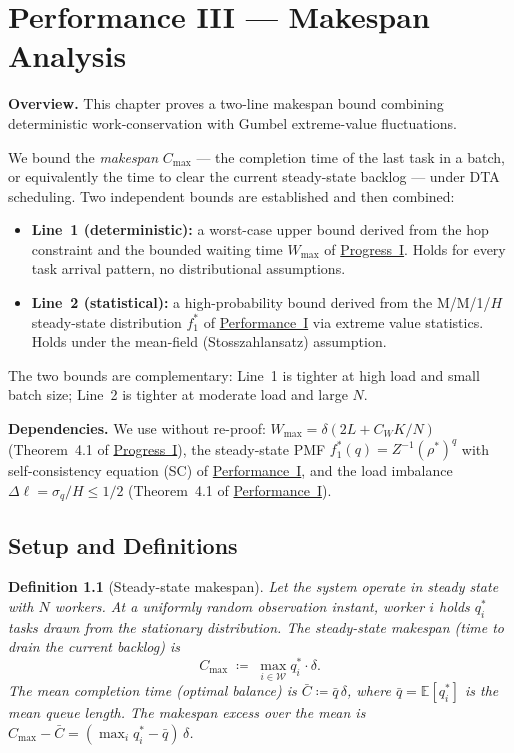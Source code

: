 \documentclass[11pt,a4paper]{report}
\newtheorem{definition}{Definition}[section]
\newcommand{\rhostar}{\rho^{*}}
\newcommand{\Wmax}{W_{\max}}
\newcommand{\qbar}{\bar{q}}
\newcommand{\Dl}{\Delta\ell}
\newcommand{\Cmax}{C_{\max}}
\newcommand{\Cbar}{\bar{C}}
\newcommand{\sigmaq}{\sigma_q}
\begin{document}
\chapter{Performance III --- Makespan Analysis}
\label{chap:makespan}

\bigskip
\noindent\textbf{Overview.}
This chapter proves a two-line makespan bound combining deterministic
work-conservation with Gumbel extreme-value fluctuations.

We bound the \emph{makespan} $\Cmax$ --- the completion time of the last task
in a batch, or equivalently the time to clear the current steady-state
backlog --- under DTA scheduling.
Two independent bounds are established and then combined:
\begin{itemize}
  \item \textbf{Line~1 (deterministic):} a worst-case upper bound derived
        from the hop constraint and the bounded waiting time
        $\Wmax$ of \hyperref[chap:bounded_wait]{Progress~I}.
        Holds for every task arrival pattern, no distributional assumptions.
  \item \textbf{Line~2 (statistical):} a high-probability bound derived
        from the M/M/1/$H$ steady-state distribution $f_1^*$ of
        \hyperref[chap:load_balance]{Performance~I} via extreme value statistics.
        Holds under the mean-field (Stosszahlansatz) assumption.
\end{itemize}
The two bounds are complementary: Line~1 is tighter at high load and
small batch size; Line~2 is tighter at moderate load and large $N$.

\noindent\textbf{Dependencies.}
We use without re-proof:
$\Wmax = \delta(2L + C_W K/N)$ (Theorem~4.1 of \hyperref[chap:bounded_wait]{Progress~I}),
the steady-state PMF $f_1^*(q) = Z^{-1}(\rhostar)^q$ with self-consistency
equation (SC) of \hyperref[chap:load_balance]{Performance~I},
and the load imbalance $\Dl = \sigmaq/H \leq 1/2$
(Theorem~4.1 of \hyperref[chap:load_balance]{Performance~I}).

\section{Setup and Definitions}

\begin{definition}[Steady-state makespan]
\label{def:makespan}
Let the system operate in steady state with $N$ workers.
At a uniformly random observation instant, worker $i$ holds $q_i^*$
tasks drawn from the stationary distribution.
The \emph{steady-state makespan} (time to drain the current backlog) is
\[
  \Cmax \;\coloneqq\; \max_{i \in \mathcal{W}} q_i^* \cdot \delta.
\]
The mean completion time (optimal balance) is
$\Cbar \coloneqq \qbar\,\delta$,
where $\qbar = \mathbb{E}[q_i^*]$ is the mean queue length.
The makespan \emph{excess} over the mean is
$\Cmax - \Cbar = (\max_i q_i^* - \qbar)\,\delta$.
\end{definition}
\end{document}
